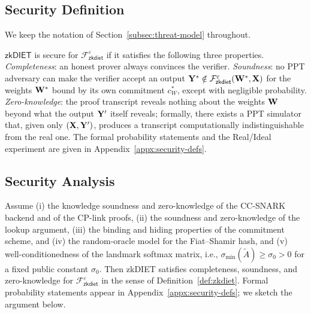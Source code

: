 \documentclass[runningheads]{llncs}
\begin{document}
\subsection{Security Definition}
\label{subsec:sec-def}

We keep the notation of Section~\ref{subsec:threat-model} throughout.

\begin{definition}
\label{def:zkdiet}
$\mathsf{zkDIET}$ is secure for $\mathcal{F}^{\varepsilon}_{\mathsf{zkdiet}}$ if it satisfies the following three properties.
\emph{Completeness}: an honest prover always convinces the verifier.
\emph{Soundness}: no PPT adversary can make the verifier accept an output ${\mathbf{Y}}^{*}\notin\mathcal{F}^{\varepsilon}_{\mathsf{zkdiet}}({\mathbf{W}}^{*},{\mathbf{X}})$ for the weights ${\mathbf{W}}^{*}$ bound by its own commitment $c_{W}^{*}$, except with negligible probability.
\emph{Zero-knowledge}: the proof transcript reveals nothing about the weights ${\mathbf{W}}$ beyond what the output ${\mathbf{Y}}'$ itself reveals; formally, there exists a PPT simulator that, given only $({\mathbf{X}},{\mathbf{Y}}')$, produces a transcript computationally indistinguishable from the real one.
The formal probability statements and the Real/Ideal experiment are given in Appendix~\ref{appx:security-defs}.
\end{definition}

\subsection{Security Analysis}
\label{sec:security-analysis}

\begin{theorem}[informal]
\label{thm:security}
Assume (i) the knowledge soundness and zero-knowledge of the CC-SNARK
backend and of the CP-link proofs, (ii) the soundness and zero-knowledge of the lookup argument, (iii) the binding and hiding properties of the commitment scheme, and (iv) the random-oracle model for the Fiat--Shamir hash, and (v) well-conditionedness of the landmark softmax matrix, i.e., $\sigma_{\min}(\tilde{A}) \geq \sigma_0 > 0$ for a fixed public constant $\sigma_0$. Then \textsf{zkDIET} satisfies completeness, soundness, and zero-knowledge for $\mathcal{F}^{\varepsilon}_{\mathsf{zkdiet}}$ in the sense of Definition~\ref{def:zkdiet}. Formal probability statements appear in Appendix~\ref{appx:security-defs}; we sketch the argument below.
\end{theorem}
\end{document}
